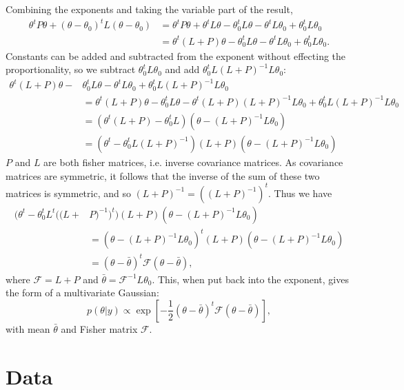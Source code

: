 \documentclass[a4paper,11pt,twoside]{article}
\begin{document}
Combining the exponents and taking the variable part of the result,
\begin{align*}
	\theta^t P \theta + (\theta - \theta_0)^t L (\theta - \theta_0) &= \theta^t P \theta + \theta^t L \theta - \theta_0^t L \theta - \theta^t L \theta_0 + \theta_0^t L \theta_0
	\\ &= \theta^t(L+P) \theta - \theta_0^t L \theta - \theta^t L \theta_0 + \theta_0^t L \theta_0.
\end{align*}
Constants can be added and subtracted from the exponent without effecting the proportionality, so we subtract $\theta_0^t L \theta_0$ and add $\theta_0^t L (L+P)^{-1} L \theta_0$:
\begin{align*}
	\theta^t(L+P) \theta - & \theta_0^t L \theta - \theta^t L \theta_0 + \theta_0^t L (L+P)^{-1} L \theta_0
	\\ &= \theta^t(L+P) \theta - \theta_0^t L \theta - \theta^t(L+P)(L+P)^{-1} L \theta_0 + \theta_0^t L (L+P)^{-1} L \theta_0
	\\ &= (\theta^t(L+P) - \theta_0^t L)(\theta - (L+P)^{-1} L \theta_0)
	\\ &= (\theta^t - \theta_0^t L (L+P)^{-1})(L+P)(\theta - (L+P)^{-1} L \theta_0)
\end{align*}
$P$ and $L$ are both fisher matrices, i.e. inverse covariance matrices. As
covariance matrices are symmetric, it follows that the inverse of the sum of
these two matrices is symmetric, and so $(L+P)^{-1} = ((L+P)^{-1})^{t}$. Thus we have
\begin{align*}
	(\theta^t - \theta_0^t L^t ((L+ & P)^{-1})^{t}) (L+P) (\theta - (L+P)^{-1} L \theta_0)
	\\ &= (\theta -(L+P)^{-1} L \theta_0)^{t} (L+P) (\theta - (L+P)^{-1} L \theta_0)
	\\ &= (\theta - \bar{\theta})^t \mathcal{F} (\theta - \bar{\theta}),
\end{align*}
where $\mathcal{F} = L + P$ and $\bar{\theta} = \mathcal{F}^{-1} L \theta_0$.
This, when put back into the exponent, gives the form of a multivariate
Gaussian:
\begin{equation*}
	p(\theta|y) \propto \exp \left[-\frac{1}{2}(\theta - \bar{\theta})^t \mathcal{F} (\theta - \bar{\theta})\right],
\end{equation*}
with mean $\bar{\theta}$ and Fisher matrix $\mathcal{F}$.

\section{Data}
\label{sec:2ddata}
\end{document}
